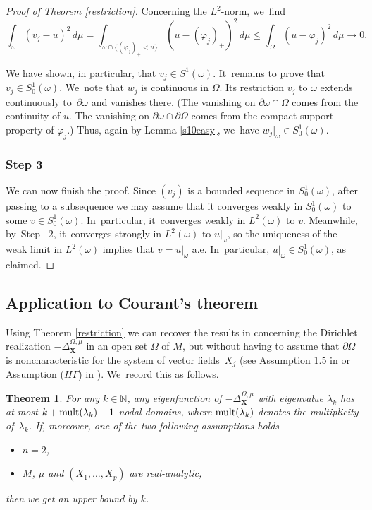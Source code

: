 \documentclass[JEP,XML,SOM,Unicode,published]{cedram}
\newcommand{\mult}{\textup{mult}}
\newcommand{\bX}{{\boldsymbol{X}}}
\newtheorem{theorem}{Theorem}[section]
\theoremstyle{definition}
\let\phi\varphi
\let\Xb\bX
\newcommand{\1}{\mathbbm{1}}
\begin{document}
\begin{proof}[Proof of Theorem \ref{restriction}]
Concerning the $L^2$-norm, we~find
\[
\int_\omega (v_j - u)^2\,d\mu = \int_{\omega\cap\{ (\phi_j)_+< u\}} (u - (\phi_j)_+)^2\,d\mu
\leq \int_\Omega (u-\phi_j)^2\,d\mu \to 0.
\]

We have shown, in particular, that $v_j\in S^1(\omega)$. It~remains to prove that $v_j\in S^1_0(\omega)$. We~note that $w_j$ is continuous in $\Omega$. Its restriction $v_j$ to $\omega$ extends continuously to~$\partial\omega$ and vanishes there. (The vanishing on $\partial\omega\cap\Omega$ comes from the continuity of $u$. The vanishing on $\partial\omega\cap\partial\Omega$ comes from the compact support property of $\phi_j$.) Thus, again by Lemma \ref{s10easy}, we~have $w_j|_\omega\in S^1_0(\omega)$.

\subsubsection*{Step 3} We can now finish the proof. Since $(v_j)$ is a bounded sequence in $S^1_0(\omega)$, after passing to a subsequence we may assume that it converges weakly in $S^1_0(\omega)$ to some $v\in S^1_0(\omega)$. In~particular, it~converges weakly in $L^2(\omega)$ to $v$. Meanwhile, by~Step~ 2, it~converges strongly in $L^2(\omega)$ to $u|_\omega$, so the uniqueness of the weak limit in $L^2(\omega)$ implies that $v=u|_\omega$ a.e. In~particular, $u|_\omega\in S^1_0(\omega)$, as claimed.
\end{proof}

\subsection{Application to Courant's theorem}\label{ss2.7}
Using Theorem \ref{restriction} we can recover the results in \cite{EL} concerning the Dirichlet realization $-\Delta^{\Omega,\mu}_\Xb$ in an open set $\Omega$ of $M$, but without having to assume that $\partial \Omega$ is noncharacteristic for the system of vector fields~$X_j$ (see Assumption 1.5 in \cite{EL} or Assumption ($H\Gamma$) in \cite{De}). We~record this as follows.

\begin{theorem}\label{courant}
For any $k\in \mathbb N$, any eigenfunction of $-\Delta_\Xb^{\Omega,\mu}$ with eigenvalue $\lambda_k$ has at most
$k+ \mult(\lambda_k)-1$ nodal domains, where $\mult(\lambda_k)$ denotes the multiplicity of~$\lambda_k$.
If, moreover, one of the two following assumptions holds
\begin{itemize}
\item $n=2$,
\item $M$, $\mu$ and $(X_1,\dots, X_p)$ are real-analytic,
\end{itemize}
then we get an upper bound by $k$.
\end{theorem}
\end{document}

